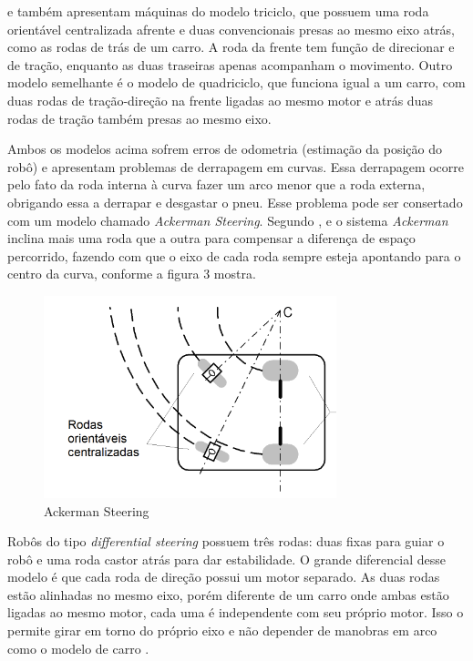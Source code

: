 \cite{Secchi2008} e \cite{Borenstein1996} também apresentam máquinas do modelo triciclo, que possuem uma roda orientável centralizada afrente e duas convencionais presas ao mesmo eixo atrás, como as rodas de trás de um carro. A roda da frente tem função de direcionar e de tração, enquanto as duas traseiras apenas acompanham o movimento. Outro modelo semelhante é o modelo de quadriciclo, que funciona igual a um carro, com duas rodas de tração-direção na frente ligadas ao mesmo motor e atrás duas rodas de tração também presas ao mesmo eixo. 

Ambos os modelos acima sofrem erros de odometria (estimação da posição do robô) e apresentam problemas de derrapagem em curvas. Essa derrapagem ocorre pelo fato da roda interna à curva fazer um arco menor que a roda externa, obrigando essa a derrapar e desgastar o pneu. Esse problema pode ser consertado com um modelo chamado \textit{Ackerman Steering}. Segundo \cite{Borenstein1996}, \cite{Secchi2008} e \cite{Bagnall2011} o sistema \textit{Ackerman} inclina mais uma roda que a outra para compensar a diferença de espaço percorrido, fazendo com que o eixo de cada roda sempre esteja apontando para o centro da curva, conforme a figura 3 mostra.

\begin{figure}[h]
	\centering
	\label{fig03}
		\includegraphics[keepaspectratio=true,scale=1]{figuras/2ackerman.png}
	\caption{Ackerman Steering \cite{Secchi2008}}
\end{figure}

Robôs do tipo \textit{differential steering} possuem três rodas: duas fixas para guiar o robô e uma roda castor atrás para dar estabilidade. O grande diferencial desse modelo é que cada roda de direção possui um motor separado. As duas rodas estão alinhadas no mesmo eixo, porém diferente de um carro onde ambas estão ligadas ao mesmo motor, cada uma é independente com seu próprio motor. Isso o permite girar em torno do próprio eixo e não depender de manobras em arco como o modelo de carro \cite{Bagnall2011} \cite{Secchi2008} \cite{Mataric2007}.

